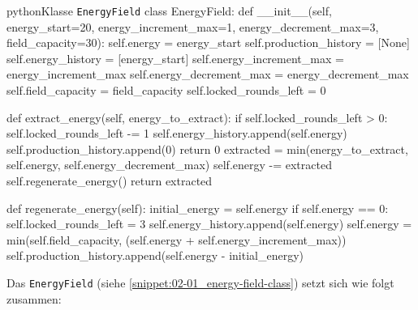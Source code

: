 \begin{snippet}[htb]
    \centering
    \begin{codebox}{python}{Klasse \texttt{EnergyField}}
        class EnergyField:
            def __init__(self, energy_start=20, energy_increment_max=1, energy_decrement_max=3, field_capacity=30):
                self.energy = energy_start
                self.production_history = [None]
                self.energy_history = [energy_start]
                self.energy_increment_max = energy_increment_max
                self.energy_decrement_max = energy_decrement_max
                self.field_capacity = field_capacity
                self.locked_rounds_left = 0
            
            def extract_energy(self, energy_to_extract):
                if self.locked_rounds_left > 0:
                    self.locked_rounds_left -= 1
                    self.energy_history.append(self.energy)
                    self.production_history.append(0)
                    return 0
                extracted = min(energy_to_extract, self.energy, self.energy_decrement_max)
                self.energy -= extracted
                self.regenerate_energy()
                return extracted
            
            def regenerate_energy(self):
                initial_energy = self.energy
                if self.energy == 0:
                    self.locked_rounds_left = 3
                self.energy_history.append(self.energy)
                self.energy = min(self.field_capacity, (self.energy + self.energy_increment_max))
                self.production_history.append(self.energy - initial_energy)
    \end{codebox}
    \caption{Implementierung der Klasse \texttt{EnergyField}}
    \label{snippet:02-01_energy-field-class}
\end{snippet}

Das \texttt{EnergyField} (siehe \autoref{snippet:02-01_energy-field-class}) setzt sich wie folgt zusammen:

